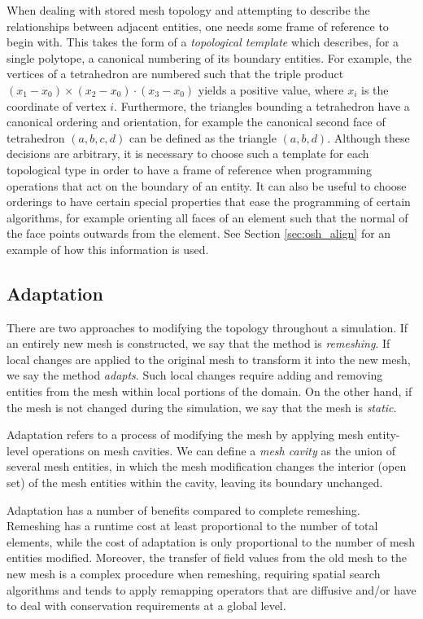 When dealing with stored mesh topology and attempting to describe
the relationships between adjacent entities, one needs some frame
of reference to begin with.
This takes the form of a \emph{topological template}
\cite{seol2005fmdb, karamete2016novel} which describes,
for a single polytope, a canonical numbering of its boundary entities.
For example, the vertices of a tetrahedron are numbered such that
the triple product $(x_1-x_0)\times(x_2-x_0)\cdot(x_3-x_0)$ yields
a positive value, where $x_i$ is the coordinate of vertex $i$.
Furthermore, the triangles bounding a tetrahedron have a canonical
ordering and orientation, for example the canonical second face of tetrahedron
$(a,b,c,d)$ can be defined as the triangle $(a,b,d)$.
Although these decisions are arbitrary, it is necessary to choose
such a template for each topological type in order to have
a frame of reference when programming operations that act on the boundary
of an entity.
It can also be useful to choose orderings to have certain special
properties that ease the programming of certain algorithms, for
example orienting all faces of an element such that the normal of
the face points outwards from the element.
See Section \ref{sec:osh_align} for an example of how this
information is used.

\subsection{Adaptation}
\label{sec:def_adapt}

There are two approaches to modifying the topology throughout
a simulation.
If an entirely new mesh is constructed, we say that the
method is {\it remeshing}.
If local changes are applied to the original mesh to transform
it into the new mesh, we say the method {\it adapts}.
Such local changes require adding and removing entities
from the mesh within local portions of the domain.
On the other hand, if the mesh is not changed during the
simulation, we say that the mesh is {\it static}.

Adaptation refers to a process of modifying the mesh by applying
mesh entity-level operations on mesh cavities.
We can define a {\it mesh cavity} as the
union of several mesh entities, in which the
mesh modification changes the interior (open set) of
the mesh entities within the cavity, leaving its boundary unchanged.

Adaptation has a number of benefits compared to complete remeshing.
Remeshing has a runtime cost at least proportional to the number
of total elements, while the cost of adaptation is only proportional
to the number of mesh entities modified.
Moreover, the transfer of field values from the old mesh
to the new mesh is a complex procedure when remeshing,
requiring spatial search algorithms and
tends to apply remapping operators that are diffusive and/or
have to deal with conservation requirements at a global level.

